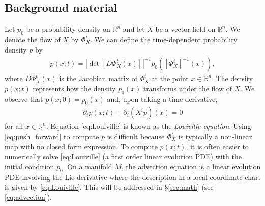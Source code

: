 \documentclass[letterpaper, 12 pt]{amsart}
\newcommand{\R}{\mathbb{R}}
\begin{document}
\subsection{Background material}
  Let $p_0$ be a probability density on $\R^n$
  and let $X$ be a vector-field on $\R^n$.
  We denote the flow of $X$
  by $\Phi_X^t$.
  We can define the time-dependent probability
  density $p$ by
  \begin{align}
    p( x ; t) = 
    \left| \det\left[ D\Phi_X^t(x) \right] \right|^{-1} p_0\left( \left[\Phi_X^t\right]^{-1}(x) \right), \label{eq:push_forward}
  \end{align}
  where $D\Phi_X^t(x)$ is the Jacobian matrix of
  $\Phi_X^t$ at the point $x \in \R^n$.
  The density $p(x;t)$ represents how the density
  $p_0(x)$ transforms under the flow of $X$.
  We observe that $p(x;0) = p_0(x)$ and, upon taking
  a time derivative,
  \begin{align}
    \partial_t p (x;t) + \partial_i (X^i p)(x) = 0 \label{eq:Louiville}
  \end{align}
  for all $x \in \R^n$.
  Equation \eqref{eq:Louiville} is known as the \emph{Louiville equation}.
  Using \eqref{eq:push_forward} to compute $p$ is difficult
  because $\Phi_X^t$ is typically a non-linear map with no closed
  form expression.
  To compute $p( x ; t)$, it is often easier
  to numerically solve \eqref{eq:Louiville}
  (a first order linear evolution PDE)
  with the initial condition $p_0$.
  On a manifold $M$, the advection equation is a linear
  evolution PDE involving the Lie-derivative
  where the description in a local coordinate chart is
  given by \eqref{eq:Louiville}.
  This will be addressed in \S \ref{sec:math} (see \eqref{eq:advection}).
\end{document}
